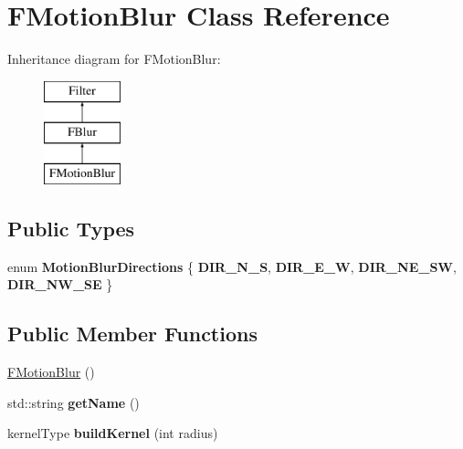 \hypertarget{classFMotionBlur}{\section{F\-Motion\-Blur Class Reference}
\label{classFMotionBlur}
}
Inheritance diagram for F\-Motion\-Blur\-:\begin{figure}[H]
\begin{center}
\leavevmode
\includegraphics[height=3.000000cm]{classFMotionBlur}
\end{center}
\end{figure}
\subsection*{Public Types}
\begin{DoxyCompactItemize}
\item 
enum {\bfseries Motion\-Blur\-Directions} \{ {\bfseries D\-I\-R\-\_\-\-N\-\_\-\-S}, 
{\bfseries D\-I\-R\-\_\-\-E\-\_\-\-W}, 
{\bfseries D\-I\-R\-\_\-\-N\-E\-\_\-\-S\-W}, 
{\bfseries D\-I\-R\-\_\-\-N\-W\-\_\-\-S\-E}
 \}
\end{DoxyCompactItemize}
\subsection*{Public Member Functions}
\begin{DoxyCompactItemize}
\item 
\hyperlink{classFMotionBlur_a670df8e9b43ff1ff3b262b6d48b944cf}{F\-Motion\-Blur} ()
\item 
\hypertarget{classFMotionBlur_aeb40f52478dcf27d5fa8fec4aa473975}{std\-::string {\bfseries get\-Name} ()}\label{classFMotionBlur_aeb40f52478dcf27d5fa8fec4aa473975}

\item 
\hypertarget{classFMotionBlur_a105abc618c4fe5ddd890ad2ff1836979}{kernel\-Type {\bfseries build\-Kernel} (int radius)}\label{classFMotionBlur_a105abc618c4fe5ddd890ad2ff1836979}

\end{DoxyCompactItemize}


